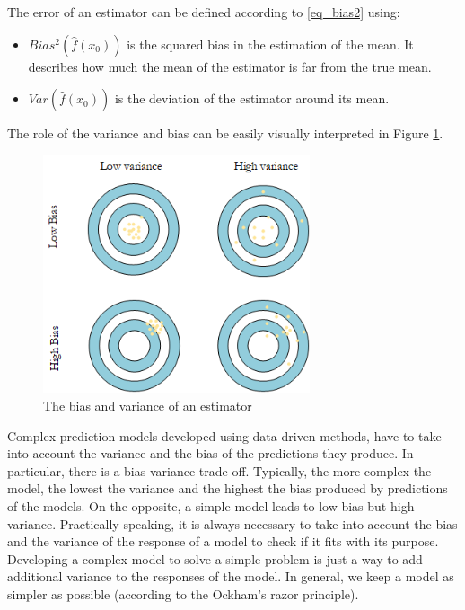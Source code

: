The error of an estimator can be defined according to \ref{eq_bias2} using:
\begin{itemize}
    \item 	$Bias^2\left(\hat{f}\left(x_0\right)\right)$ is the squared bias in the estimation of the mean. It describes how much the mean of the estimator is far from the true mean.
    \item 	$Var\left(\hat{f}\left(x_0\right)\right)$ is the deviation of the estimator around its mean.
\end{itemize}

The role of the variance and bias can be easily visually interpreted in Figure \ref{fig_biasVariance}.

\begin{figure}[hbt!]
\centering
\includegraphics[width=0.7\textwidth]{SectionLetsMath/elemStat_figures/fig_biasVariance.png}
\captionsetup{type=figure}
\caption{The bias and variance of an estimator}
\label{fig_biasVariance}
\end{figure}

Complex prediction models developed using data-driven methods, have to take into account the variance and the bias of the predictions they produce. In particular, there is a bias-variance trade-off. Typically, the more complex the model, the lowest the variance and the highest the bias produced by predictions of the models. On the opposite, a simple model leads to low bias but high variance. Practically speaking, it is always necessary to take into account the bias and the variance of the response of a model to check if it fits with its purpose. Developing a complex model to solve a simple problem is just a way to add additional variance to the responses of the model. In general, we keep a model as simpler as possible (according to the Ockham's razor principle). \par

